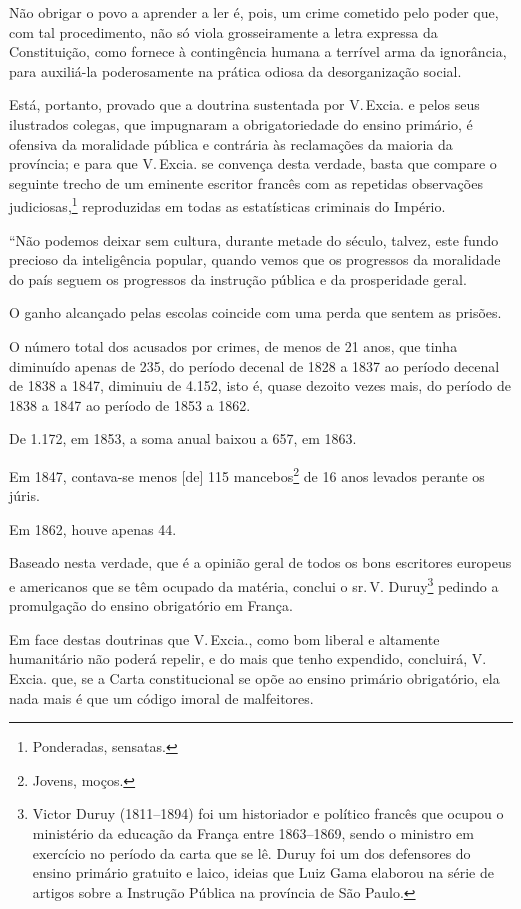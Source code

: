 Não obrigar o povo a aprender a ler é, pois, um crime cometido pelo
poder que, com tal procedimento, não só viola grosseiramente a letra
expressa da Constituição, como fornece à contingência humana a terrível
arma da ignorância, para auxiliá-la poderosamente na prática odiosa da
desorganização social.

Está, portanto, provado que a doutrina sustentada por V.\,Excia. e pelos
seus ilustrados colegas, que impugnaram a obrigatoriedade do ensino
primário, é ofensiva da moralidade pública e contrária às reclamações da
maioria da província; e para que V.\,Excia. se convença desta verdade,
basta que compare o seguinte trecho de um eminente escritor francês com
as repetidas observações judiciosas,\footnote{Ponderadas, sensatas.}
reproduzidas em todas as estatísticas criminais do Império.

``Não podemos deixar sem cultura, durante metade do século, talvez, este
fundo precioso da inteligência popular, quando vemos que os progressos
da moralidade do país seguem os progressos da instrução pública e da
prosperidade geral.

O ganho alcançado pelas escolas coincide com uma perda que sentem as
prisões.

O número total dos acusados por crimes, de menos de 21 anos, que tinha
diminuído apenas de 235, do período decenal de 1828 a 1837 ao período
decenal de 1838 a 1847, diminuiu de 4.152, isto é, quase dezoito vezes
mais, do período de 1838 a 1847 ao período de 1853 a 1862.

De 1.172, em 1853, a soma anual baixou a 657, em 1863.

Em 1847, contava-se menos {[}de{]} 115 mancebos\footnote{Jovens,
  moços.} de 16 anos levados perante os júris.

Em 1862, houve apenas 44.

Baseado nesta verdade, que é a opinião geral de todos os bons escritores
europeus e americanos que se têm ocupado da matéria, conclui o sr.\,V.
Duruy\footnote{Victor Duruy (1811--1894) foi um historiador e político
  francês que ocupou o ministério da educação da França entre 1863--1869,
  sendo o ministro em exercício no período da carta que se lê. Duruy foi
  um dos defensores do ensino primário gratuito e laico, ideias que Luiz
  Gama elaborou na série de artigos sobre a Instrução Pública na
  província de São Paulo.\label{duruy}} pedindo a promulgação do ensino obrigatório
em França.

Em face destas doutrinas que V.\,Excia., como bom liberal e altamente
humanitário não poderá repelir, e do mais que tenho expendido,
concluirá, V.\,Excia. que, se a Carta constitucional se opõe ao ensino
primário obrigatório, ela nada mais é que um código imoral de
malfeitores.

